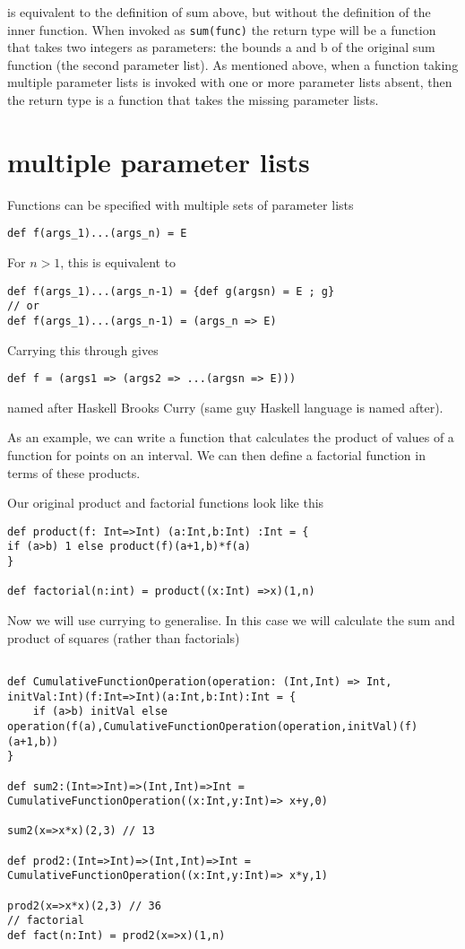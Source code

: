 is equivalent to the definition of sum above, but without the definition of the inner function. When invoked as \lstinline|sum(func)| the return type will be a function that takes two integers as parameters: the bounds a and b of the original sum function (the second parameter list). As mentioned above, when a function taking multiple parameter lists is invoked with one or more parameter lists absent, then the return type is a function that takes the missing parameter lists.

\section{multiple parameter lists}
Functions can be specified with multiple sets of parameter lists

\begin{lstlisting}
def f(args_1)...(args_n) = E
\end{lstlisting}
For $n > 1$, this is equivalent to

\begin{lstlisting}
def f(args_1)...(args_n-1) = {def g(argsn) = E ; g}
// or
def f(args_1)...(args_n-1) = (args_n => E)
\end{lstlisting}

Carrying this through gives
\begin{lstlisting}
def f = (args1 => (args2 => ...(argsn => E)))
\end{lstlisting}
named after Haskell Brooks Curry (same guy Haskell language is named after).

As an example, we can write a function that calculates the product of values of a function for points on an interval.
We can then define a factorial function in terms of these products.

Our original product and factorial functions look like this
\begin{lstlisting}
def product(f: Int=>Int) (a:Int,b:Int) :Int = {
if (a>b) 1 else product(f)(a+1,b)*f(a)  
}

def factorial(n:int) = product((x:Int) =>x)(1,n)
\end{lstlisting}

Now we will use currying to generalise. In this case we will calculate the sum and product of squares (rather than factorials)
\begin{lstlisting}

def CumulativeFunctionOperation(operation: (Int,Int) => Int, initVal:Int)(f:Int=>Int)(a:Int,b:Int):Int = {
    if (a>b) initVal else operation(f(a),CumulativeFunctionOperation(operation,initVal)(f)(a+1,b))
}

def sum2:(Int=>Int)=>(Int,Int)=>Int = CumulativeFunctionOperation((x:Int,y:Int)=> x+y,0)

sum2(x=>x*x)(2,3) // 13

def prod2:(Int=>Int)=>(Int,Int)=>Int = CumulativeFunctionOperation((x:Int,y:Int)=> x*y,1)

prod2(x=>x*x)(2,3) // 36
// factorial
def fact(n:Int) = prod2(x=>x)(1,n)

\end{lstlisting}

